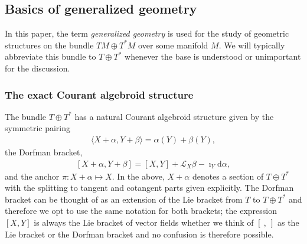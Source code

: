\documentclass[letterpaper,12pt]{article}
\newcommand{\TT}{{T\oplus T^*}}
\newcommand{\Lie}{\mathcal{L}}
\newcommand{\ap}{\alpha}
\newcommand{\bt}{\beta}
\newcommand{\rd}{\mathrm{d}}
\newcommand{\brac}{[\ ,\ ]}
\theoremstyle{definition}
\theoremstyle{remark}
\theoremstyle{examples}
\begin{document}
\subsection{Basics of generalized geometry}
In this paper, the term {\it generalized geometry} is used for the study of geometric structures on the bundle $TM \oplus T^*M$ over some manifold $M$. We will typically abbreviate this bundle to $\TT$ whenever the base is understood or unimportant for the discussion.

\subsubsection{The exact Courant algebroid structure}
The bundle $\TT$ has a natural Courant algebroid structure given by the symmetric pairing
\begin{align*}
\langle X+\ap,Y+\bt\rangle=\ap(Y)+\bt(Y),
\end{align*}
the Dorfman bracket,
\begin{align}\label{eq:dorfman}
[ X+\ap,Y+\bt]=[X,Y]+\Lie_X\bt-\imath_Y\rd \ap, 
\end{align}
and the anchor $\pi:X+\ap\mapsto X$. In the above, $X+\ap$ denotes a section of $\TT$ with the splitting to tangent and cotangent parts given explicitly. The Dorfman bracket can be thought of as an extension of the Lie bracket from $T$ to $\TT$ and therefore we opt to use the same notation for both brackets; the expression $[X,Y]$ is always the Lie bracket of vector fields whether we think of $\brac$ as the Lie bracket or the Dorfman bracket and no confusion is therefore possible.
\end{document}
